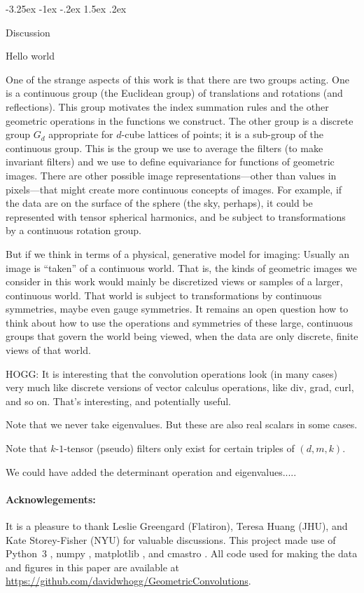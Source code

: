 \documentclass{article}
\makeatletter
\theoremstyle{plain}
\renewcommand\section{\@startsection {section}{1}{\z@}%
  {-3.25ex \@plus -1ex \@minus -.2ex}%
  {1.5ex \@plus .2ex}%
  {\raggedright\normalfont\large\bfseries}}%
\makeatother
\begin{document}
\section{Discussion}\label{sec:discussion}

Hello world

One of the strange aspects of this work is that there are two groups acting.
One is a continuous group (the Euclidean group) of translations and rotations (and reflections).
This group motivates the index summation rules and the other geometric operations in the functions we construct.
The other group is a discrete group $G_d$ appropriate for $d$-cube lattices of points; it is a sub-group of the continuous group.
This is the group we use to average the filters (to make invariant filters) and we use to define equivariance for functions of geometric images.
There are other possible image representations---other than values in pixels---that might create more continuous concepts of images.
For example, if the data are on the surface of the sphere (the sky, perhaps), it could be represented with tensor spherical harmonics, and be subject to transformations by a continuous rotation group.

But if we think in terms of a physical, generative model for imaging: Usually an image is ``taken'' of a continuous world.
That is, the kinds of geometric images we consider in this work would mainly be discretized views or samples of a larger, continuous world.
That world is subject to transformations by continuous symmetries, maybe even gauge symmetries.
It remains an open question how to think about how to use the operations and symmetries of these large, continuous groups that govern the world being viewed, when the data are only discrete, finite views of that world.

HOGG: It is interesting that the convolution operations look (in many cases) very much like discrete versions of vector calculus operations, like div, grad, curl, and so on. That's interesting, and potentially useful.

Note that we never take eigenvalues. But these are also real scalars in some cases.

Note that $k$-$1$-tensor (pseudo) filters only exist for certain triples of $(d, m, k)$.

We could have added the determinant operation and eigenvalues.....

\paragraph{Acknowlegements:}
It is a pleasure to thank
Leslie Greengard (Flatiron),
Teresa Huang (JHU), and
Kate Storey-Fisher (NYU) for valuable discussions.
This project made use of Python~3 \cite{python3}, numpy \cite{numpy}, matplotlib \cite{matplotlib}, and cmastro \cite{cmastro}.
All code used for making the data and figures in this paper are available at \url{https://github.com/davidwhogg/GeometricConvolutions}.


\raggedright

\end{document}

